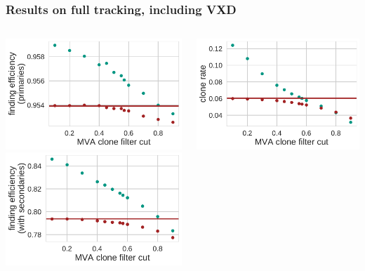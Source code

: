 \documentclass[18pt, aspectratio=169]{beamer}
\begin{document}
\begin{frame}
  \frametitle{Results on full tracking,  including VXD}
  \begin{columns}
    \begin{column}{0.3\textwidth}
      \centering
      \includegraphics[width=1.0\textwidth]{figures/ca_is_matched_primaries_fullreco.pdf}\\
      \includegraphics[width=1.0\textwidth]{figures/ca_is_matched_with_secondaries_fullreco.pdf}
    \end{column}
    \begin{column}{0.3\textwidth}
      \centering
      \includegraphics[width=1.0\textwidth]{figures/ca_clone_rate_fullreco.pdf}\\

\end{column}
\end{columns}
\end{frame}
\end{document}
